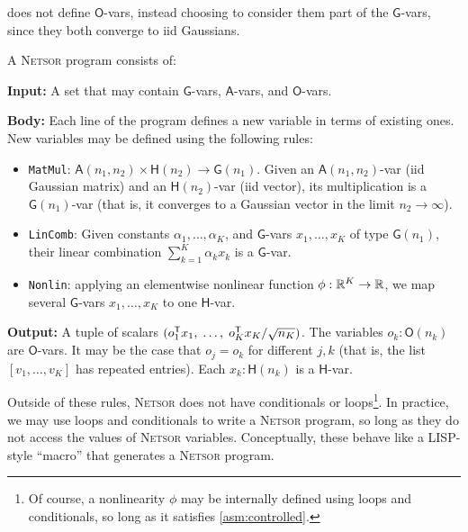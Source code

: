 \documentclass[accepted]{uai2021} %
\newcommand{\Netsor}{\textsc{Netsor}\xspace}
\newcommand{\Gva}{\mathsf{G}}
\newcommand{\Hva}{\mathsf{H}}
\newcommand{\Ava}{\mathsf{A}}
\newcommand{\Ova}{\mathsf{O}}
\newcommand{\MatMul}{\texttt{MatMul}\xspace}
\newcommand{\LinComb}{\texttt{LinComb}\xspace}
\newcommand{\Nonlin}{\texttt{Nonlin}\xspace}
\newcommand{\0}{\boldsymbol{0}}
\newcommand{\1}{\boldsymbol{1}}
\begin{document}
\citet{yang2019wide} does not define $\Ova$-vars, instead choosing to consider them part of the $\Gva$-vars, since they both converge to \ac{iid} Gaussians.

\begin{definition}
A \textsc{Netsor} program consists of:

\textbf{Input:}
 A set that may contain $\Gva$-vars, $\Ava$-vars, and $\Ova$-vars.

\textbf{Body:}
Each line of the program defines a new variable in terms of existing ones.
New variables may be defined using the following rules:
\begin{itemize}
  \item\MatMul: $\Ava(n_1, n_2) \times \Hva(n_2) \to \Gva(n_1)$. Given
        an $\Ava(n_{1}, n_{2})$-var (\ac{iid} Gaussian matrix) and an $\Hva(n_{2})$-var (\ac{iid} vector), its multiplication is a $\Gva(n_{1})$-var (that is, it
        converges to a Gaussian vector in the limit $n_2 \to \infty$).
  \item\LinComb: Given constants $\alpha_1,\dots,\alpha_K$, and $\Gva$-vars
    $x_1,\dots,x_K$ of type $\Gva(n_1)$, their linear combination $\sum_{k=1}^K \alpha_k
    x_k$ is a $\Gva$-var.
  \item\Nonlin: applying an elementwise nonlinear function $\phi : {\mathbb{R}}^K \to
    {\mathbb{R}}$, we map
    several $\Gva$-vars $x_1,\dots,x_K$ to one $\Hva$-var.
\end{itemize}

\textbf{Output:}
A tuple of scalars $(o_1^{\mathsf{T}} x_1, \;\dots, \; o_K^{\mathsf{T}}
x_K/\sqrt{n_K})$. The variables $o_k : \Ova(n_{k})$ are $\Ova$-vars. It may be the case that $o_j = o_k$ for
different $j, k$ (that is, the list $[v_{1},\dots,v_{K}]$ has repeated entries). Each $x_k : \Hva(n_k)$ is a $\Hva$-var.
\end{definition}

Outside of these rules, \Netsor does not have conditionals or loops\footnote{Of course, a nonlinearity $\phi$ may be internally defined using loops and conditionals, so long as it satisfies \cref{asm:controlled}.}. In
practice, we may use loops and conditionals to write a \Netsor program, so long
as they do not access the values of \Netsor variables. Conceptually, these
behave like a LISP-style ``macro'' that generates a \Netsor program.

\end{document}
